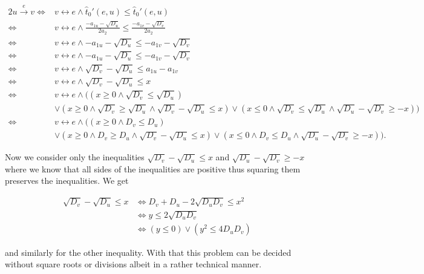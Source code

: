 \begin{alignat*}{2}
  u \overset e\rightarrow v \iff& v \leftrightarrow e \land \hat t_0'(e, u) \leq \hat t_0'(e, u) \\
  \iff& v \leftrightarrow e \land \frac{-a_{1u} - \sqrt{D_u}}{2a_2} \leq \frac{-a_{1v} - \sqrt{D_v}}{2a_2} \\
  \iff& v \leftrightarrow e \land -a_{1u} - \sqrt{D_u} \leq -a_{1v} - \sqrt{D_v} \\
  \iff& v \leftrightarrow e \land -a_{1u} - \sqrt{D_u} \leq -a_{1v} - \sqrt{D_v} \\
  \iff& v \leftrightarrow e \land \sqrt{D_v} - \sqrt{D_u} \leq a_{1u} - a_{1v}  \\
  \iff& v \leftrightarrow e \land \sqrt{D_v} - \sqrt{D_u} \leq x  \\
  \iff& v \leftrightarrow e \land ((x \geq 0 \land \sqrt{D_v} \leq \sqrt{D_u})\\ & \lor (x \geq 0 \land \sqrt{D_v} \geq \sqrt{D_u} \land \sqrt{D_v} - \sqrt{D_u} \leq x )\lor(x \leq 0 \land \sqrt{D_v} \leq \sqrt{D_u} \land \sqrt{D_u} - \sqrt{D_v} \geq -x ) )  \\
  \iff& v \leftrightarrow e \land ((x \geq 0 \land D_v \leq D_u)\\ & \lor (x \geq 0 \land D_v \geq D_u \land \sqrt{D_v} - \sqrt{D_u} \leq x )\lor(x \leq 0 \land D_v \leq D_u \land \sqrt{D_u} - \sqrt{D_v} \geq -x ) ).
\end{alignat*}

Now we consider only the inequalities \(\sqrt{D_v} - \sqrt{D_u} \leq x\) and \(\sqrt{D_u} - \sqrt{D_v} \geq -x\) where we know that all sides of the inequalities are positive thus squaring them preserves the inequalities. We get 

\begin{align*}
  \sqrt{D_v} - \sqrt{D_u} \leq x &\iff D_v + D_u - 2\sqrt{D_uD_v} \leq x^2 \\
   &\iff y \leq 2\sqrt{D_uD_v} \\
   &\iff (y \leq 0) \lor (y^2 \leq 4D_uD_v)
\end{align*}

and similarly for the other inequality. With that this problem can be decided without square roots or divisions albeit in a rather technical manner.







